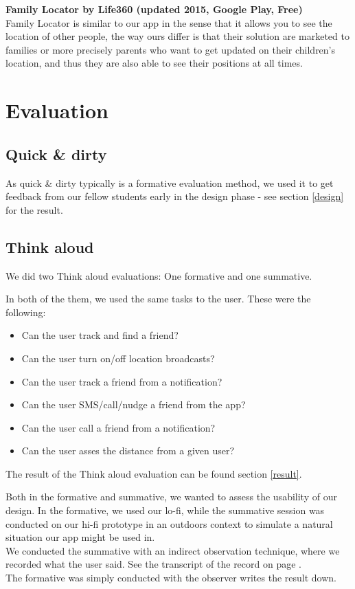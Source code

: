 \documentclass[runningheads,a4paper]{llncs}
\begin{document}
\textbf{Family Locator by Life360 (updated 2015, Google Play, Free)}\\
Family Locator is similar to our app in the sense that it allows you to see the location of other people, the way ours differ is that their solution are marketed to families or more precisely parents who want to get updated on their children's location, and thus they are also able to see their positions at all times. 


\section{Evaluation}
\subsection*{Quick \& dirty}
As quick \& dirty typically is a formative evaluation method, we used it to get feedback from our fellow students early in the design phase - see section \ref{design} for the result.

\subsection*{Think aloud}
We did two Think aloud evaluations: One formative and one summative.

In both of the them, we used the same tasks to the user. These were the following: 

\begin{itemize}
\item Can the user track and find a friend? 
\item Can the user turn on/off location broadcasts? 
\item Can the user track a friend from a notification?
\item Can the user SMS/call/nudge a friend from the app?
\item Can the user call a friend from a notification?
\item Can the user asses the distance from a given user?
\end{itemize}
The result of the Think aloud evaluation can be found section \ref{result}. 

Both in the formative and summative, we wanted to assess the usability of our design. In the formative, we used our lo-fi, while the summative session was conducted on our hi-fi prototype in an outdoors context to simulate a natural situation our app might be used in.\\
We conducted the summative with an indirect observation technique, where we recorded what the user said. See the transcript of the record on page \pageref{transcript}. \\
The formative was simply conducted with the observer writes the result down. 
\end{document}
